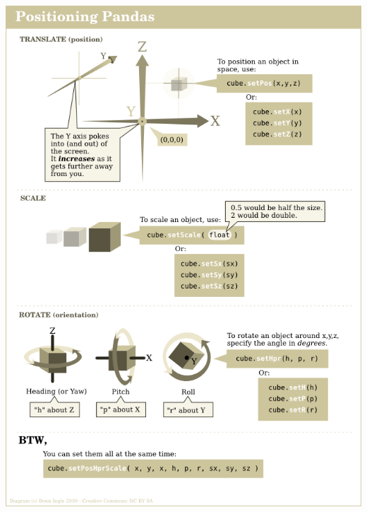 \documentclass[a4paper,10pt]{book}
\begin{document}
\begin{center}
\includegraphics[scale=0.8]{CommonManipulations.png} 
\end{center}
\end{document}
